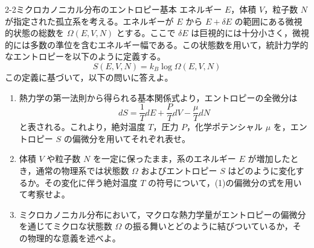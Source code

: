 
\begin{mondai}{2-2}{ミクロカノニカル分布のエントロピー}{基本}
エネルギー $E$，体積 $V$，粒子数 $N$ が指定された孤立系を考える。エネルギーが $E$ から $E + \delta E$ の範囲にある微視的状態の総数を $\Omega(E, V, N)$ とする。ここで $\delta E$ は巨視的には十分小さく，微視的には多数の準位を含むエネルギー幅である。この状態数を用いて，統計力学的なエントロピーを以下のように定義する。
\begin{equation*}
S(E, V, N) = k_B \log \Omega(E, V, N)
\end{equation*}
この定義に基づいて，以下の問いに答えよ。

\begin{enumerate}
  \item 熱力学の第一法則から得られる基本関係式より，エントロピーの全微分は
  \begin{equation*}
  dS = \frac{1}{T} dE + \frac{P}{T} dV - \frac{\mu}{T} dN
  \end{equation*}
  と表される。これより，絶対温度 $T$，圧力 $P$，化学ポテンシャル $\mu$ を，エントロピー $S$ の偏微分を用いてそれぞれ表せ。

  \item 体積 $V$ や粒子数 $N$ を一定に保ったまま，系のエネルギー $E$ が増加したとき，通常の物理系では状態数 $\Omega$ およびエントロピー $S$ はどのように変化するか。その変化に伴う絶対温度 $T$ の符号について，(1)の偏微分の式を用いて考察せよ。

  \item ミクロカノニカル分布において，マクロな熱力学量がエントロピーの偏微分を通じてミクロな状態数 $\Omega$ の振る舞いとどのように結びついているか，その物理的な意義を述べよ。
\end{enumerate}
\end{mondai}

